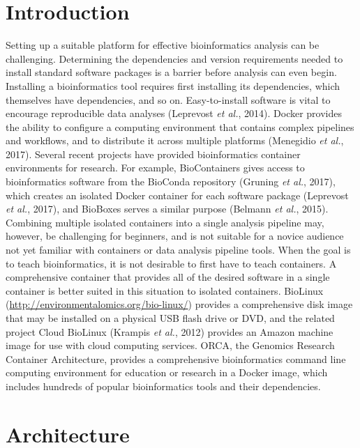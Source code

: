 \documentclass{bioinfo}
\begin{document}
\maketitle

\section{Introduction}

Setting up a suitable platform for effective bioinformatics analysis can be challenging. Determining the dependencies and version requirements needed to install standard software packages is a barrier before analysis can even begin. Installing a bioinformatics tool requires first installing its dependencies, which themselves have dependencies, and so on. Easy-to-install software is vital to encourage reproducible data analyses (Leprevost \emph{et al.}, 2014). Docker provides the ability to configure a computing environment that contains complex pipelines and workflows, and to distribute it across multiple platforms (Menegidio \emph{et al.}, 2017). Several recent projects have provided bioinformatics container environments for research. For example, BioContainers gives access to bioinformatics software from the BioConda repository (Gruning \emph{et al.}, 2017), which creates an isolated Docker container for each software package (Leprevost \emph{et al.}, 2017), and BioBoxes serves a similar purpose (Belmann \emph{et al.}, 2015). Combining multiple isolated containers into a single analysis pipeline may, however, be challenging for beginners, and is not suitable for a novice audience not yet familiar with containers or data analysis pipeline tools. When the goal is to teach bioinformatics, it is not desirable to first have to teach containers. A comprehensive container that provides all of the desired software in a single container is better suited in this situation to isolated containers. BioLinux (\url{http://environmentalomics.org/bio-linux/}) provides a comprehensive disk image that may be installed on a physical USB flash drive or DVD, and the related project Cloud BioLinux (Krampis \emph{et al.}, 2012) provides an Amazon machine image for use with cloud computing services. ORCA, the Genomics Research Container Architecture, provides a comprehensive bioinformatics command line computing environment for education or research in a Docker image, which includes hundreds of popular bioinformatics tools and their dependencies.

\section{Architecture}
\end{document}
